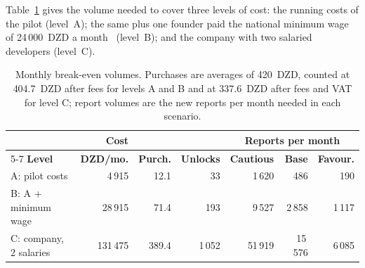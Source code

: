 Table~\ref{tab:breakeven} gives the volume needed to cover three levels of cost:
the running costs of the pilot (level~A); the same plus one founder paid the
national minimum wage of 24\,000~DZD a month~\cite{autoentrepreneur2026}
(level~B); and the company with two salaried developers (level~C).

\begin{table}[htbp]
\centering
\caption{Monthly break-even volumes. Purchases are averages of 420~DZD, counted
at 404.7~DZD after fees for levels A and B and at 337.6~DZD after fees and VAT
for level C; report volumes are the new reports per month needed in each
scenario.}
\label{tab:breakeven}
\small
\setlength{\tabcolsep}{5pt}
\begin{tabularx}{\textwidth}{@{}X r r r r r r@{}}
\toprule
 & \textbf{Cost} & & & \multicolumn{3}{c}{\textbf{Reports per month}} \\
\cmidrule(l){5-7}
\textbf{Level} & \textbf{DZD/mo.} & \textbf{Purch.} & \textbf{Unlocks} & \textbf{Cautious} & \textbf{Base} & \textbf{Favour.} \\
\midrule
A: pilot costs           & 4\,915   & 12.1  & 33     & 1\,620  & 486     & 190 \\
B: A + minimum wage      & 28\,915  & 71.4  & 193    & 9\,527  & 2\,858  & 1\,117 \\
C: company, 2 salaries   & 131\,475 & 389.4 & 1\,052 & 51\,919 & 15\,576 & 6\,085 \\
\bottomrule
\end{tabularx}
\end{table}

